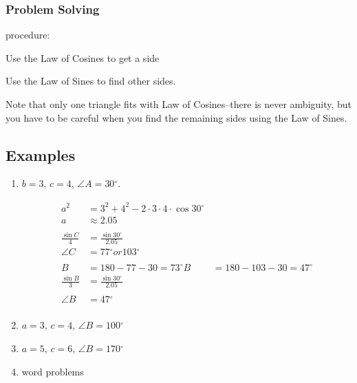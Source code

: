 \documentclass{exam}
\newcommand{\dg}{\ensuremath{^\circ}}
\begin{document}
  \subsubsection{Problem Solving}

  procedure:
  \begin{itemize*}
    \item Use the Law of Cosines to get a side
    \item Use the Law of Sines to find other sides.    
  \end{itemize*}

  Note that only one triangle fits with Law of Cosines--there is never ambiguity, but you have to be careful when you
  find the remaining sides using the Law of Sines.

  \subsection{Examples}
  \begin{enumerate}
    \item $b = 3$, $c = 4$, $\angle A = 30 \dg$.  
      \begin{solution}
        \begin{align*}
          a^2 &= 3^2 + 4^2 - 2 \cdot 3 \cdot 4 \cdot \cos 30 \dg \\
          a &\approx 2.05 \\
          \\
          \frac{\sin C}{4} &= \frac{\sin 30 \dg}{2.05} \\
          \angle C &= 77 \dg { or } 103 \dg \\
          \\
          B &= 180 - 77 - 30 = 73 \dg
          B &= 180 - 103 - 30 = 47 \dg
          \\
          \frac{\sin B}{3} &= \frac{\sin 30 \dg}{2.05} \\
          \\
          \angle B &= 47 \dg \\
        \end{align*}
      \end{solution}

    \item $a = 3$, $c = 4$, $\angle B = 100 \dg$

    \item $a = 5$, $c = 6$, $\angle B = 170 \dg$

    \item word problems

  \end{enumerate}
\end{document}
